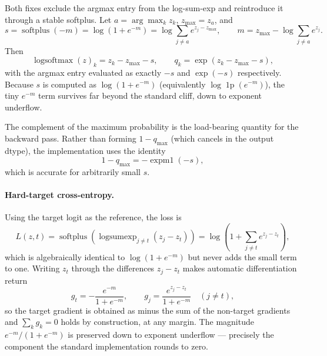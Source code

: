 Both fixes exclude the argmax entry from the log-sum-exp and reintroduce it through a stable softplus. Let $a = \arg\max_k z_k$, $z_{\max} = z_a$, and
\begin{equation}
s = \operatorname{softplus}\!\left(-m\right) = \log\!\left(1 + e^{-m}\right)
    = \log \sum_{j \neq a} e^{z_j - z_{\max}} ,
\qquad m = z_{\max} - \log \sum_{j \neq a} e^{z_j}.
\label{eq:softplus-margin}
\end{equation}
Then
\begin{equation}
\operatorname{logsoftmax}(z)_k = z_k - z_{\max} - s,
\qquad
q_k = \exp\!\left(z_k - z_{\max} - s\right),
\label{eq:fixed-values}
\end{equation}
with the argmax entry evaluated as exactly $-s$ and $\exp(-s)$ respectively. Because $s$ is computed as $\log(1 + e^{-m})$ (equivalently $\log\!\operatorname{1p}(e^{-m})$), the tiny $e^{-m}$ term survives far beyond the standard cliff, down to exponent underflow.

The complement of the maximum probability is the load-bearing quantity for the backward pass. Rather than forming $1 - q_{\max}$ (which cancels in the output dtype), the implementation uses the identity
\begin{equation}
1 - q_{\max} = -\operatorname{expm1}(-s),
\label{eq:one-minus-qmax}
\end{equation}
which is accurate for arbitrarily small $s$.

\paragraph{Hard-target cross-entropy.} Using the target logit as the reference, the loss is
\begin{equation}
L(z,t) = \operatorname{softplus}\!\left(\operatorname{logsumexp}_{j \neq t}\left(z_j - z_t\right)\right)
       = \log\!\left(1 + \sum_{j \neq t} e^{z_j - z_t}\right),
\label{eq:fixed-ce}
\end{equation}
which is algebraically identical to $\log(1 + e^{-m})$ but never adds the small term to one. Writing $z_t$ through the differences $z_j - z_t$ makes automatic differentiation return
\begin{equation}
g_t = -\frac{e^{-m}}{1 + e^{-m}}, \qquad
g_j = \frac{e^{z_j - z_t}}{1 + e^{-m}} \quad (j \neq t),
\label{eq:fixed-gradients}
\end{equation}
so the target gradient is obtained as minus the sum of the non-target gradients and
$\sum_k g_k = 0$ holds by construction, at any margin. The magnitude $e^{-m}/(1+e^{-m})$ is preserved down to exponent underflow --- precisely the component the standard implementation rounds to zero.

